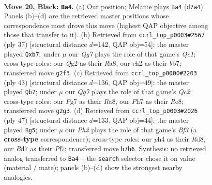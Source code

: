 \documentclass[11pt]{article}
\begin{document}
\clearpage

\begin{figure}[p]\centering
\begin{subfigure}{0.46\textwidth}\centering
\resizebox{\linewidth}{!}{%
\newchessgame
\chessboard[
  setfen={rn4k1/pQ1b1ppp/4p3/8/2r1P2P/4nN2/PP1N2qR/RK6 b - - 1 20},
  showmover=false,
  pgfstyle=straightmove, color=movearrow, markmove={d7-a4}
]}
\caption{}
\end{subfigure}\hfill
\begin{subfigure}{0.46\textwidth}\centering
\resizebox{\linewidth}{!}{%
\newchessgame
\chessboard[
  setfen={r1q1kr2/1B1n1pQp/1p2p3/1p4P1/8/5N2/PP3P1P/3RK2R b Kq - 0 19},
  showmover=false,
  pgfstyle=straightmove, color=movearrow, markmove={c8-b7}
]}
\caption{}
\end{subfigure}
\\[4pt]
\begin{subfigure}{0.46\textwidth}\centering
\resizebox{\linewidth}{!}{%
\newchessgame
\chessboard[
  setfen={r3r1k1/2qb1ppp/p1NQ2n1/3pP3/3N4/8/PP3PPP/R4RK1 b - - 4 22},
  showmover=false,
  pgfstyle=straightmove, color=movearrow, markmove={c7-b7}
]}
\caption{}
\end{subfigure}\hfill
\begin{subfigure}{0.46\textwidth}\centering
\resizebox{\linewidth}{!}{%
\newchessgame
\chessboard[
  setfen={3r2k1/5pp1/pn3b1p/3pqN2/2r2N2/3QP2P/P1R2PP1/5RK1 b - - 6 24},
  showmover=false,
  pgfstyle=straightmove, color=movearrow, markmove={f6-g5}
]}
\caption{}
\end{subfigure}
\caption{\textbf{Move 20, Black: \texttt{Ba4}.} (a) Our position; Melanie plays \texttt{Ba4} (\texttt{d7a4}). Panels (b)--(d) are the retrieved master positions whose correspondence most drove this move (highest QAP objective among those that transfer to it). (b) Retrieved from \texttt{ccrl\_top\_p0003\#2567} (ply 37) [structural distance $d$=142, QAP obj=54]: the master played \texttt{Qxb7}; under $\mu$ our \emph{Qg7} plays the role of that game's \emph{Qc1}; cross-type roles: our \emph{Q}g2 as their \emph{R}a8, our \emph{r}h2 as their \emph{b}b7; transferred move \texttt{g2f3}. (c) Retrieved from \texttt{ccrl\_top\_p0000\#2203} (ply 43) [structural distance $d$=136, QAP obj=49]: the master played \texttt{Qb7}; under $\mu$ our \emph{Qg7} plays the role of that game's \emph{Qc2}; cross-type roles: our \emph{P}g7 as their \emph{R}a8, our \emph{P}h7 as their \emph{R}e8; transferred move \texttt{g2g3}. (d) Retrieved from \texttt{ccrl\_top\_p0003\#2026} (ply 47) [structural distance $d$=133, QAP obj=44]: the master played \texttt{Bg5}; under $\mu$ our \emph{Ph2} plays the role of that game's \emph{Bf3} (a \textbf{cross-type} correspondence); cross-type roles: our \emph{p}h4 as their \emph{R}d8, our \emph{B}d7 as their \emph{P}f7; transferred move \texttt{h7h6}. Synthesis: no retrieved analog transferred to \texttt{Ba4} -- the \texttt{search} selector chose it on value (material / mate); panels (b)--(d) show the strongest nearby analogies.}
\label{fig:thought-m39}
\end{figure}
\end{document}
